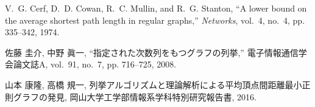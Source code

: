\begin{thebibliography}{1}
\BIBentryALTinterwordspacing
V.~G. Cerf, D.~D. Cowan, R.~C. Mullin, and R.~G. Stanton, 
\newblock ``{A lower bound on the average shortest path length in regular graphs},''
\newblock \emph{Networks}, vol.~4, no.~4, pp. 335--342, 1974.
\BIBentrySTDinterwordspacing

\BIBentryALTinterwordspacing
佐藤 圭介, 中野 眞一,
\newblock ``指定された次数列をもつグラフの列挙,''
\newblock 電子情報通信学会論文誌A, vol.~91, no.~7, pp. 716--725, 2008.
\BIBentrySTDinterwordspacing

山本 康隆, 高橋 規一,
\newblock 列挙アルゴリズムと理論解析による平均頂点間距離最小正則グラフの発見,
\newblock 岡山大学工学部情報系学科特別研究報告書, 2016.

\end{thebibliography}
